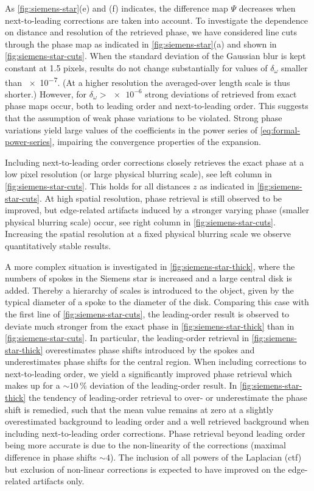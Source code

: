 \documentclass[
twoside,
openright,
titlepage,
numbers=noenddot,
headinclude,
fleqn,
a4paper,
footinclude=true,
cleardoublepage=empty,
abstractoff,
BCOR=5mm,
paper=a4,
fontsize=11pt,
british,ngerman,american,
]{scrreprt}
\begin{document}
As \cref{fig:siemens-star}(e) and (f) indicates, the difference map
$\Psi$ decreases when next-to-leading corrections are taken into
account.  To investigate the dependence on distance and resolution of
the retrieved phase, we have considered line cuts through the phase
map as indicated in \cref{fig:siemens-star}(a) and shown in
\cref{fig:siemens-star-cuts}.  When the standard deviation of the
Gaussian blur is kept constant at 1.5 pixels, results do not change
substantially for values of $\delta_\omega$ smaller than \num{e-7}.
(At a higher resolution the averaged-over length scale is thus
shorter.)  However, for $\delta_\omega>\num{e-6}$ strong deviations of
retrieved from exact phase maps occur, both to leading order and
next-to-leading order.  This suggests that the assumption of weak
phase variations to be violated.  Strong phase variations yield large
values of the coefficients in the power series of
\cref{eq:formal-power-series}, impairing the convergence properties of
the expansion.

Including next-to-leading order corrections closely retrieves the
exact phase at a low pixel resolution (or large physical blurring
scale), see left column in \cref{fig:siemens-star-cuts}.  This holds
for all distances $z$ as indicated in \cref{fig:siemens-star-cuts}.
At high spatial resolution, phase retrieval is still observed to be
improved, but edge-related artifacts induced by a stronger varying
phase (smaller physical blurring scale) occur, see right column in
\cref{fig:siemens-star-cuts}.  Increasing the spatial resolution at a
fixed physical blurring scale we observe quantitatively stable
results.

A more complex situation is investigated in
\cref{fig:siemens-star-thick}, where the numbers of spokes in the
Siemens star is increased and a large central disk is added.  Thereby
a hierarchy of scales is introduced to the object, given by the
typical diameter of a spoke to the diameter of the disk.  Comparing
this case with the first line of \cref{fig:siemens-star-cuts}, the
leading-order result is observed to deviate much stronger from the
exact phase in \cref{fig:siemens-star-thick} than in
\cref{fig:siemens-star-cuts}.  In particular, the leading-order
retrieval in \cref{fig:siemens-star-thick} overestimates phase shifts
introduced by the spokes and underestimates phase shifts for the
central region.  When including corrections to next-to-leading order,
we yield a significantly improved phase retrieval which makes up for a
$\sim\SI{10}{\percent}$ deviation of the leading-order result.  In
\cref{fig:siemens-star-thick} the tendency of leading-order retrieval
to over- or underestimate the phase shift is remedied, such that the
mean value remains at zero at a slightly overestimated background to
leading order and a well retrieved background when including
next-to-leading order corrections.  Phase retrieval beyond leading
order being more accurate is due to the non-linearity of the
corrections (maximal difference in phase shifts $\sim 4$).  The
inclusion of all powers of the Laplacian (\acs{ctf}) but exclusion of
non-linear corrections is expected to have improved on the
edge-related artifacts only.
\end{document}
